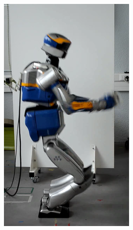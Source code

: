 \begin{figure}
\begin{subfigure}{0.19\columnwidth}
    \includegraphics[width = \columnwidth]
                    {src/chap3-optimal-motion-planning/figure/self-collision-3.png}
    \label{self-collision-3}
  \end{subfigure}
  \begin{subfigure}{0.19\columnwidth}
    \centering

\end{subfigure}
\end{figure}
